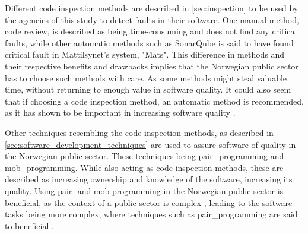 \newpage

Different code inspection methods are described in \autoref{sec:inspection} to be used by the agencies of this study to detect faults in their software. One manual method, code review, is described as being time-consuming and does not find any critical faults, while other automatic methods such as SonarQube is said to have found critical fault in Mattilsynet's system, "Mats". This difference in methods and their respective benefits and drawbacks implies that the Norwegian public sector has to choose such methods with care. As some methods might steal valuable time, without returning to enough value in software quality. It could also seem that if choosing a code inspection method, an automatic method is recommended, as it has shown to be important in increasing software quality \cite{smm_2018}.


Other techniques resembling the code inspection methods, as described in \autoref{sec:software_development_techniques} are used to assure software of quality in the Norwegian public sector. These techniques being \gls{pair_programming} and \gls{mob_programming}. While also acting as code inspection methods, these are described as increasing ownership and knowledge of the software, increasing its quality. Using pair- and mob programming in the Norwegian public sector is beneficial, as the context of a public sector is complex \cite{jc_2010}, leading to the software tasks being more complex, where techniques such as \gls{pair_programming} are said to beneficial \cite{jeh_2009}. 


